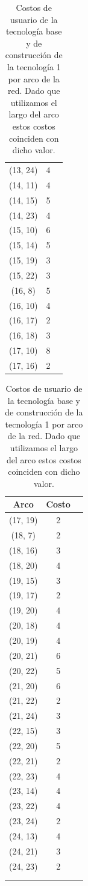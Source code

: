 \begin{table}[h!]
\begin{tabular}{ccc}
    (13, 24) & 4 \\
    (14, 11) & 4 \\
    (14, 15) & 5 \\
    (14, 23) & 4 \\
    (15, 10) & 6 \\
    (15, 14) & 5 \\
    (15, 19) & 3 \\
    (15, 22) & 3 \\
    (16, 8) & 5 \\
    (16, 10) & 4 \\
    (16, 17) & 2 \\
    (16, 18) & 3 \\
    (17, 10) & 8 \\
    (17, 16) & 2 \\
 \bottomrule
\end{tabular}
\begin{tabular}{ccc}
  \toprule
    Arco & Costo \\
  \midrule
    (17, 19) & 2 \\
    (18, 7) & 2 \\
    (18, 16) & 3 \\
    (18, 20) & 4 \\
    (19, 15) & 3 \\
    (19, 17) & 2 \\
    (19, 20) & 4 \\
    (20, 18) & 4 \\
    (20, 19) & 4 \\
    (20, 21) & 6 \\
    (20, 22) & 5 \\
    (21, 20) & 6 \\
    (21, 22) & 2 \\
    (21, 24) & 3 \\
    (22, 15) & 3 \\
    (22, 20) & 5 \\
    (22, 21) & 2 \\
    (22, 23) & 4 \\
    (23, 14) & 4 \\
    (23, 22) & 4 \\
    (23, 24) & 2 \\
    (24, 13) & 4 \\
    (24, 21) & 3 \\
    (24, 23) & 2 \\
     & \\
     & \\
  \bottomrule
\end{tabular}
\caption{Costos de usuario de la tecnología base y de construcción de la tecnología 1 por arco de la red. Dado que utilizamos el largo del arco estos costos coinciden con dicho valor.}\label{table:siouxfallsgraphdata}
\end{table}

